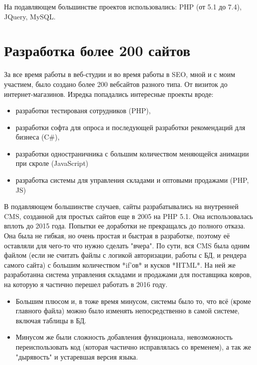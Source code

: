\documentclass[10pt]{tpl/developercv} %
\begin{document}

\newpage
{}

На подавляющем большинстве проектов использовались: PHP (от 5.1 до 7.4), JQuery, MySQL.

\section{Разработка более 200 сайтов}

За все время работы в веб-студии и во время работы в SEO, мной и с моим участием, было создано более 200 вебсайтов разного типа. От визиток до интернет-магазинов. Изредка попадались интересные проекты вроде:
\begin{itemize}
   \item разработки тестированя сотрудников (PHP),
   \item разработки софта для опроса и последующей разработки рекомендаций для бизнеса (C\#),
   \item разработки одностраничника с большим количеством меняющейся анимации при скроле (JavaScript)
   \item разработка системы для управления складами и оптовыми продажами (PHP, JS)
\end{itemize}

В подавляющем большинстве случаев, сайты разрабатывались на внутренней CMS, созданной для простых сайтов еще в 2005 на PHP 5.1. Она использовалась вплоть до 2015 года. Попытки ее доработки не прекращалсь до полного отказа. Она была не гибкая, но очень простая и быстрая в разработке, поэтому её оставляли для чего-то что нужно сделать "вчера". По сути, вся CMS была одним файлом (если не считать файлы с логикой авторизации, работы с БД, и рендера самого сайта) с большим количеством *if'ов* и кусков *HTML*. На ней же разработанна система управления складами и продажами для поставщика ковров, на которую я частично перешел работать в 2016 году.

\begin{itemize}
 \item Большим плюсом и, в тоже время минусом, системы было то, что всё (кроме главного файла) можно было изменять непосредственно в самой системе, включая таблицы в БД.

 \item Минусом же были сложность добавления функционала, невозможность переиспользовать код (которая частично исправлялась со временем), а так же "дырявость" и устаревшая версия языка.
\end{itemize}
\end{document}
